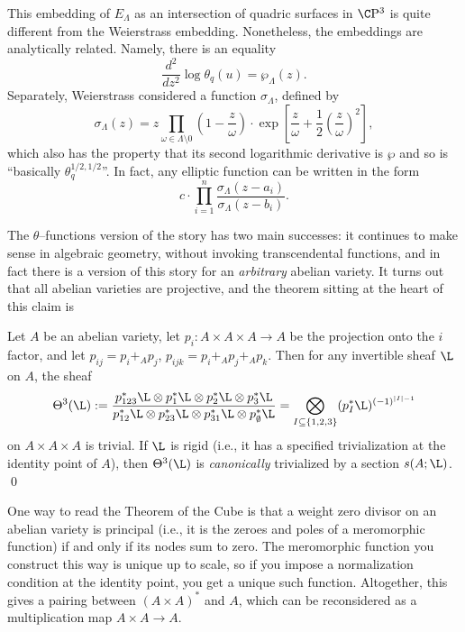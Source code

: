 \begin{remark}
This embedding of $E_\Lambda$ as an intersection of quadric surfaces in $\CP^3$ is quite different from the Weierstrass embedding.  Nonetheless, the embeddings are analytically related.  Namely, there is an equality \[\frac{d^2}{dz^2} \log \theta_q(u) = \wp_\Lambda(z).\]  Separately, Weierstrass considered a function $\sigma_\Lambda$, defined by \[\sigma_\Lambda(z) = z \prod_{\omega \in \Lambda \setminus 0} \left( 1 - \frac{z}{\omega} \right) \cdot \exp \left[ \frac{z}{\omega} + \frac{1}{2} \left( \frac{z}{\omega} \right)^2 \right],\] which also has the property that its second logarithmic derivative is $\wp$ and so is ``basically $\theta_q^{1/2,1/2}$''.  In fact, any elliptic function can be written in the form \[c \cdot \prod_{i=1}^n \frac{\sigma_\Lambda(z - a_i)}{\sigma_\Lambda(z - b_i)}.\]
\end{remark}

The $\theta$--functions version of the story has two main successes: it continues to make sense in algebraic geometry, without invoking transcendental functions, and in fact there is a version of this story for an \emph{arbitrary} abelian variety.  It turns out that all abelian varieties are projective, and the theorem sitting at the heart of this claim is
\begin{corollary}\label{Theta3IsTrivial}
Let $A$ be an abelian variety, let $p_i: A \times A \times A \to A$ be the projection onto the $i${\th} factor, and let $p_{ij} = p_i +_A p_j$, $p_{ijk} = p_i +_A p_j +_A p_k$.  Then for any invertible sheaf $\L$ on $A$, the sheaf \[\Theta^3(\L) := \frac{p_{123}^* \L \otimes p_1^* \L \otimes p_2^* \L \otimes p_3^* \L}{p_{12}^* \L \otimes p_{23}^* \L \otimes p_{31}^* \L \otimes p_\emptyset^* \L} = \bigotimes_{I \subseteq \{1, 2, 3\}} (p_I^* \L)^{(-1)^{|I| - 1}}\] on $A \times A \times A$ is trivial.  If $\L$ is rigid (i.e., it has a specified trivialization at the identity point of $A$), then $\Theta^3(\L)$ is \emph{canonically} trivialized by a section $s(A; \L)$. \qed
\end{corollary}

\begin{remark}
One way to read the Theorem of the Cube is that a weight zero divisor on an abelian variety is principal (i.e., it is the zeroes and poles of a meromorphic function) if and only if its nodes sum to zero.  The meromorphic function you construct this way is unique up to scale, so if you impose a normalization condition at the identity point, you get a unique such function.  Altogether, this gives a pairing between $(A \times A)^*$ and $A$, which can be reconsidered as a multiplication map $A \times A \to A$.
\end{remark}

